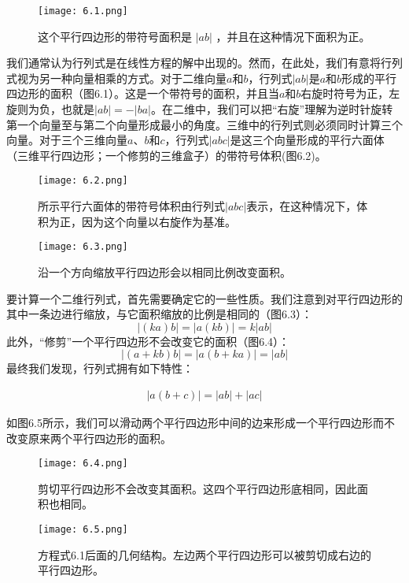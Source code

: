 \documentclass[lang=cn,12pt]{elegantbook}
\begin{document}
\begin{figure}[htbp]
\centering
\texttt{[image: 6.1.png]}
\caption{这个平行四边形的带符号面积是 $|ab|$ ，并且在这种情况下面积为正。}
\end{figure}

我们通常认为行列式是在线性方程的解中出现的。然而，在此处，我们有意将行列式视为另一种向量相乘的方式。对于二维向量$a$和$b$，行列式$|ab|$是$a$和$b$形成的平行四边形的面积（图6.1）。这是一个带符号的面积，并且当$a$和$b$右旋时符号为正，左旋则为负，也就是$|ab| = -|ba|$。在二维中，我们可以把“右旋”理解为逆时针旋转第一个向量至与第二个向量形成最小的角度。三维中的行列式则必须同时计算三个向量。对于三个三维向量$a$、$b$和$c$，行列式$|abc|$是这三个向量形成的平行六面体（三维平行四边形；一个修剪的三维盒子）的带符号体积(图6.2)。

\begin{figure}[htbp]
\centering
\texttt{[image: 6.2.png]}
\caption{所示平行六面体的带符号体积由行列式$|abc|$表示，在这种情况下，体积为正，因为这个向量以右旋作为基准。}
\end{figure}

\begin{figure}[htbp]
\centering
\texttt{[image: 6.3.png]}
\caption{沿一个方向缩放平行四边形会以相同比例改变面积。}
\end{figure}

要计算一个二维行列式，首先需要确定它的一些性质。我们注意到对平行四边形的其中一条边进行缩放，与它面积缩放的比例是相同的（图6.3）：$$|(ka)b| =  |a(kb)| = k|ab|$$此外，“修剪”一个平行四边形不会改变它的面积（图6.4）：$$|(a+kb)b| =  |a(b+ka)| = |ab|$$最终我们发现，行列式拥有如下特性：

\begin{align}
|a(b+c)| =  |ab| + |ac|
\end{align}

如图6.5所示，我们可以滑动两个平行四边形中间的边来形成一个平行四边形而不改变原来两个平行四边形的面积。

\begin{figure}[htbp]
\centering
\texttt{[image: 6.4.png]}
\caption{剪切平行四边形不会改变其面积。这四个平行四边形底相同，因此面积也相同。}
\end{figure}

\begin{figure}[htbp]
\centering
\texttt{[image: 6.5.png]}
\caption{方程式6.1后面的几何结构。左边两个平行四边形可以被剪切成右边的平行四边形。}
\end{figure}
\end{document}
